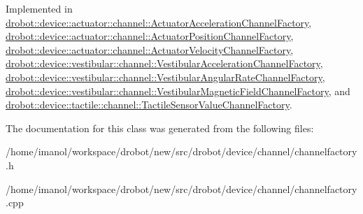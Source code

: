 Implemented in \hyperlink{classdrobot_1_1device_1_1actuator_1_1channel_1_1ActuatorAccelerationChannelFactory_a077744d3866b134b15cfe9522eeb99e3}{drobot\-::device\-::actuator\-::channel\-::\-Actuator\-Acceleration\-Channel\-Factory}, \hyperlink{classdrobot_1_1device_1_1actuator_1_1channel_1_1ActuatorPositionChannelFactory_a66d52953c14b0686b3dd61b9f8462476}{drobot\-::device\-::actuator\-::channel\-::\-Actuator\-Position\-Channel\-Factory}, \hyperlink{classdrobot_1_1device_1_1actuator_1_1channel_1_1ActuatorVelocityChannelFactory_ae60b06b9376c9b142137d97849dc8659}{drobot\-::device\-::actuator\-::channel\-::\-Actuator\-Velocity\-Channel\-Factory}, \hyperlink{classdrobot_1_1device_1_1vestibular_1_1channel_1_1VestibularAccelerationChannelFactory_a79214e8381183d99c9f27fc2abe41e59}{drobot\-::device\-::vestibular\-::channel\-::\-Vestibular\-Acceleration\-Channel\-Factory}, \hyperlink{classdrobot_1_1device_1_1vestibular_1_1channel_1_1VestibularAngularRateChannelFactory_a1a1dbc3b83511d7d50f7ff3e7bb12158}{drobot\-::device\-::vestibular\-::channel\-::\-Vestibular\-Angular\-Rate\-Channel\-Factory}, \hyperlink{classdrobot_1_1device_1_1vestibular_1_1channel_1_1VestibularMagneticFieldChannelFactory_a9eee36d4270b5beaa7e56a62bd916aa5}{drobot\-::device\-::vestibular\-::channel\-::\-Vestibular\-Magnetic\-Field\-Channel\-Factory}, and \hyperlink{classdrobot_1_1device_1_1tactile_1_1channel_1_1TactileSensorValueChannelFactory_a2e4369c57cdd99f2c59469f6451e4c0c}{drobot\-::device\-::tactile\-::channel\-::\-Tactile\-Sensor\-Value\-Channel\-Factory}.



The documentation for this class was generated from the following files\-:\begin{DoxyCompactItemize}
\item 
/home/imanol/workspace/drobot/new/src/drobot/device/channel/channelfactory.\-h\item 
/home/imanol/workspace/drobot/new/src/drobot/device/channel/channelfactory.\-cpp\end{DoxyCompactItemize}
